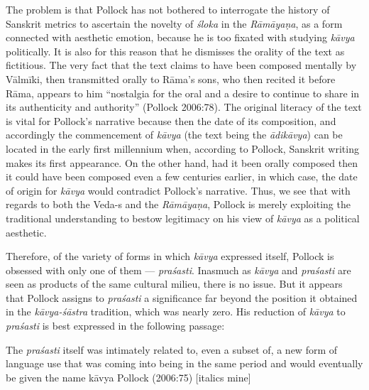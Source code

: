 The problem is that Pollock has not bothered to interrogate the history of Sanskrit metrics to ascertain the novelty of \textsl{śloka} in the \textsl{Rāmāyaṇa}, as a form connected with aesthetic emotion, because he is too fixated with studying \textsl{kāvya} politically. It is also for this reason that he dismisses the orality of the text as fictitious. The very fact that the text claims to have been composed mentally by Vālmīki, then transmitted orally to Rāma's sons, who then recited it before Rāma, appears to him ``nostalgia for the oral and a desire to continue to share in its authenticity and authority'' (Pollock 2006:78). The original literacy of the text is vital for Pollock's narrative because then the date of its composition, and accordingly the commencement of \textsl{kāvya} (the text being the \textsl{ādikāvya}) can be located in the early first millennium when, according to Pollock, Sanskrit writing makes its first appearance. On the other hand, had it been orally composed then it could have been composed even a few centuries earlier, in which case, the date of origin for \textsl{kāvya} would contradict Pollock's narrative. Thus, we see that with regards to both the Veda-s and the \textsl{Rāmāyaṇa}, Pollock is merely exploiting the traditional understanding to bestow legitimacy on his view of \textsl{kāvya} as a political aesthetic.

Therefore, of the variety of forms in which \textsl{kāvya} expressed itself, Pollock is obsessed with only one of them --- \textsl{praśasti}. Inasmuch as \textsl{kāvya} and \textsl{praśasti} are seen as products of the same cultural milieu, there is no issue. But it appears that Pollock assigns to \textsl{praśasti} a significance far beyond the position it obtained in the \textsl{kāvya-śāstra} tradition, which was nearly zero. His reduction of \textsl{kāvya} to \textsl{praśasti} is best expressed in the following passage:

\begin{myquote}
The \textsl{praśasti} itself was intimately related to, even a subset of, a new form of language use that was coming into being in the same period and would eventually be given the name kāvya 
\hfill Pollock (2006:75) [italics mine]
\end{myquote}

